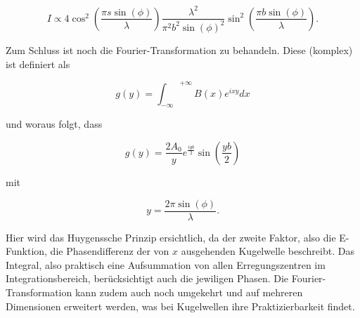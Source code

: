 \begin{equation}
    I \propto 4 \cos^2(\frac{\pi s \sin(\phi)}{\lambda}) \frac{\lambda^2}{\pi^2 b^2 \sin(\phi)^2} \sin^2(\frac{\pi b \sin(\phi)}{\lambda}).
\end{equation}

Zum Schluss ist noch die Fourier-Transformation zu behandeln. Diese (komplex) ist definiert als

\begin{equation}
    g(y) = {\int_{-\infty}}^{+\infty} B(x) e^{ixy} dx
\end{equation}

und woraus folgt, dass 

\begin{equation}
    g(y) = \frac{2A_0}{y} e^{\frac{iyb}{2}}\sin(\frac{yb}{2})
\end{equation}

mit 

\begin{equation}
    y = \frac{2\pi\sin(\phi)}{\lambda}.
\end{equation}

Hier wird das Huygenssche Prinzip ersichtlich, da der zweite Faktor, also die E-Funktion, die Phasendifferenz der von \(x\) ausgehenden Kugelwelle beschreibt. Das Integral, also praktisch eine Aufsummation von allen Erregungszentren im Integrationsbereich, berücksichtigt auch die jewiligen Phasen. Die Fourier-Transformation kann zudem auch noch umgekehrt und auf mehreren Dimensionen erweitert werden, was bei Kugelwellen ihre Praktizierbarkeit findet.

\cite{sample}
\label{sec:Theorie}